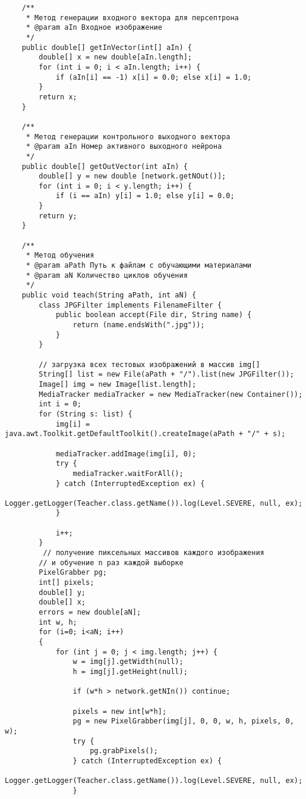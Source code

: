 \begin{verbatim}
	/**
	 * Метод генерации входного вектора для персептрона
	 * @param aIn Входное изображение
	 */
	public double[] getInVector(int[] aIn) {
		double[] x = new double[aIn.length];
        for (int i = 0; i < aIn.length; i++) {
            if (aIn[i] == -1) x[i] = 0.0; else x[i] = 1.0;
        }
        return x;
	}

	/**
	 * Метод генерации контрольного выходного вектора
	 * @param aIn Номер активного выходного нейрона
	 */
	public double[] getOutVector(int aIn) {
		double[] y = new double [network.getNOut()];
        for (int i = 0; i < y.length; i++) {
            if (i == aIn) y[i] = 1.0; else y[i] = 0.0;
        }
        return y;
	}

	/**
	 * Метод обучения
	 * @param aPath Путь к файлам с обучающими материалами
	 * @param aN Количество циклов обучения
	 */
	public void teach(String aPath, int aN) {
		class JPGFilter implements FilenameFilter {
            public boolean accept(File dir, String name) {
                return (name.endsWith(".jpg"));
            }
        }     
 
        // загрузка всех тестовых изображений в массив img[]
        String[] list = new File(aPath + "/").list(new JPGFilter());
        Image[] img = new Image[list.length];        
        MediaTracker mediaTracker = new MediaTracker(new Container());        
        int i = 0;
        for (String s: list) {
            img[i] = java.awt.Toolkit.getDefaultToolkit().createImage(aPath + "/" + s);
 
            mediaTracker.addImage(img[i], 0);
            try {
                mediaTracker.waitForAll();
            } catch (InterruptedException ex) {
                Logger.getLogger(Teacher.class.getName()).log(Level.SEVERE, null, ex);
            }
 
            i++;
        }
         // получение пиксельных массивов каждого изображения
        // и обучение n раз каждой выборке
        PixelGrabber pg;
        int[] pixels;
		double[] y;
		double[] x;
		errors = new double[aN];
        int w, h;
        for (i=0; i<aN; i++)
        {
            for (int j = 0; j < img.length; j++) {
                w = img[j].getWidth(null);
                h = img[j].getHeight(null);
 
                if (w*h > network.getNIn()) continue;
 
                pixels = new int[w*h];
                pg = new PixelGrabber(img[j], 0, 0, w, h, pixels, 0, w);
                try {
                    pg.grabPixels();
                } catch (InterruptedException ex) {
                    Logger.getLogger(Teacher.class.getName()).log(Level.SEVERE, null, ex);
                }
 

\end{verbatim}
